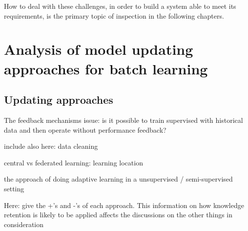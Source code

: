 How to deal with these challenges, in order to build a system able to meet its requirements, is the primary topic of inspection in the following chapters.







\chapter{Analysis of model updating approaches for batch learning}

\section{Updating approaches}

The feedback mechanisms issue: is it possible to train supervised with historical data and then operate without performance feedback?

include also here: data cleaning

central vs federated learning: learning location

the approach of doing adaptive learning in a unsupervised / semi-supervised setting

Here: give the +'s and -'s of each approach. This information on how knowledge retention is likely to be applied affects the discussions on the other things in consideration

